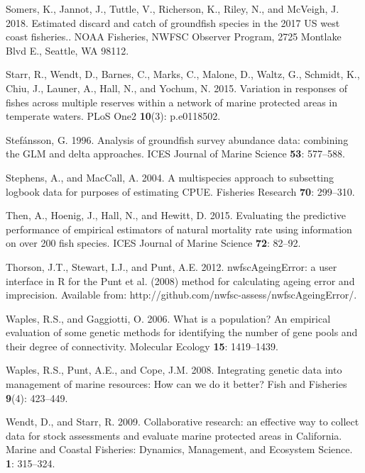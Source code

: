 \documentclass[12pt,]{article}
\begin{document}
\hypertarget{ref-Somers2018}{}
Somers, K., Jannot, J., Tuttle, V., Richerson, K., Riley, N., and
McVeigh, J. 2018. Estimated discard and catch of groundfish species in
the 2017 US west coast fisheries.. NOAA Fisheries, NWFSC Observer
Program, 2725 Montlake Blvd E., Seattle, WA 98112.

\hypertarget{ref-Starr2015}{}
Starr, R., Wendt, D., Barnes, C., Marks, C., Malone, D., Waltz, G.,
Schmidt, K., Chiu, J., Launer, A., Hall, N., and Yochum, N. 2015.
Variation in responses of fishes across multiple reserves within a
network of marine protected areas in temperate waters. PLoS One2
\textbf{10}(3): p.e0118502.

\hypertarget{ref-Stefansson1996}{}
Stefánsson, G. 1996. Analysis of groundfish survey abundance data:
combining the GLM and delta approaches. ICES Journal of Marine Science
\textbf{53}: 577--588.

\hypertarget{ref-Stephens2004}{}
Stephens, A., and MacCall, A. 2004. A multispecies approach to
subsetting logbook data for purposes of estimating CPUE. Fisheries
Research \textbf{70}: 299--310.

\hypertarget{ref-Then2015}{}
Then, A., Hoenig, J., Hall, N., and Hewitt, D. 2015. Evaluating the
predictive performance of empirical estimators of natural mortality rate
using information on over 200 fish species. ICES Journal of Marine
Science \textbf{72}: 82--92.

\hypertarget{ref-Thorson2012}{}
Thorson, J.T., Stewart, I.J., and Punt, A.E. 2012. nwfscAgeingError: a
user interface in R for the Punt et al. (2008) method for calculating
ageing error and imprecision. Available from:
http://github.com/nwfsc-assess/nwfscAgeingError/.

\hypertarget{ref-Waples2006}{}
Waples, R.S., and Gaggiotti, O. 2006. What is a population? An empirical
evaluation of some genetic methods for identifying the number of gene
pools and their degree of connectivity. Molecular Ecology \textbf{15}:
1419--1439.

\hypertarget{ref-Waples2008}{}
Waples, R.S., Punt, A.E., and Cope, J.M. 2008. Integrating genetic data
into management of marine resources: How can we do it better? Fish and
Fisheries \textbf{9}(4): 423--449.

\hypertarget{ref-Wendt2009}{}
Wendt, D., and Starr, R. 2009. Collaborative research: an effective way
to collect data for stock assessments and evaluate marine protected
areas in California. Marine and Coastal Fisheries: Dynamics, Management,
and Ecosystem Science. \textbf{1}: 315--324.
\end{document}
